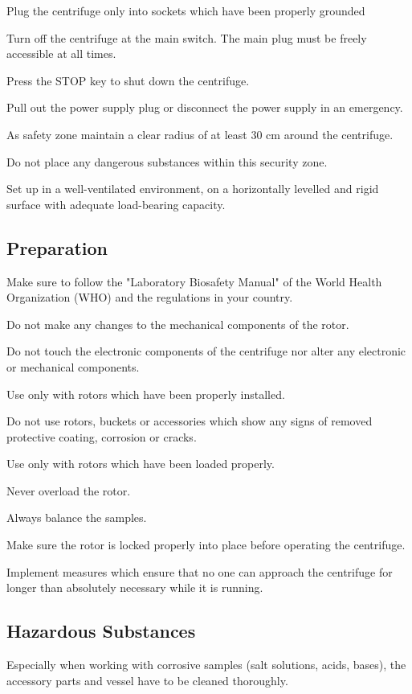 \documentclass[12pt]{../SOP3_beta}
\begin{document}
\NP Plug the centrifuge only into sockets which have been properly grounded

\NP Turn off the centrifuge at the main switch. The main plug must be freely accessible at all times.

\NP Press the STOP key to shut down the centrifuge.

\NP Pull out the power supply plug or disconnect the power supply in an emergency.

\NP As safety zone maintain a clear radius of at least 30 cm around the centrifuge.

\NP Do not place any dangerous substances within this security zone. 

\NP Set up in a well-ventilated environment, on a horizontally levelled and rigid surface with adequate load-bearing capacity.

\subsection {Preparation}

\NP Make sure to follow the "Laboratory Biosafety Manual" of the World Health Organization (WHO) and the regulations in your country.

\NP Do not make any changes to the mechanical components of the rotor.

\NP Do not touch the electronic components of the centrifuge nor alter any electronic or mechanical components.

\NP Use only with rotors which have been properly installed.

\NP Do not use rotors, buckets or accessories which show any signs of removed protective coating, corrosion or cracks. 

\NP Use only with rotors which have been loaded properly.

\NP Never overload the rotor.

\NP Always balance the samples.

\NP Make sure the rotor is locked properly into place before operating the centrifuge.

\NP Implement measures which ensure that no one can approach the centrifuge for longer than absolutely necessary while it is running.

\subsection {Hazardous Substances}

\NP Especially when working with corrosive samples (salt solutions, acids, bases), the accessory parts and vessel have to be cleaned thoroughly.
\end{document}
